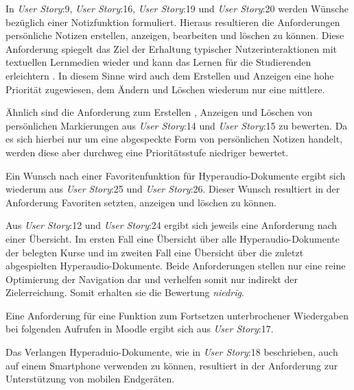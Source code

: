 In \textit{User Story}:9, \textit{User Story}:16, \textit{User Story}:19 und \textit{User Story}:20 werden Wünsche bezüglich einer Notizfunktion formuliert. Hieraus resultieren die Anforderungen persönliche Notizen erstellen, anzeigen, bearbeiten und löschen zu können. Diese Anforderung spiegelt das Ziel der Erhaltung typischer Nutzerinteraktionen mit textuellen Lernmedien wieder und kann das Lernen für die Studierenden erleichtern \citep{scutter2010students}. In diesem Sinne wird auch dem Erstellen und Anzeigen eine hohe Priorität zugewiesen, dem Ändern und Löschen wiederum nur eine mittlere.

Ähnlich sind die Anforderung zum Erstellen , Anzeigen und Löschen von persönlichen Markierungen aus \textit{User Story}:14 und \textit{User Story}:15 zu bewerten. Da es sich hierbei nur um eine abgespeckte Form von persönlichen Notizen handelt, werden diese aber durchweg eine Prioritätsstufe  niedriger bewertet.

Ein Wunsch nach einer Favoritenfunktion für Hyperaudio-Dokumente ergibt sich wiederum aus \textit{User Story}:25 und \textit{User Story}:26. Dieser Wunsch resultiert in der Anforderung Favoriten setzten, anzeigen und löschen zu können.

Aus \textit{User Story}:12 und \textit{User Story}:24 ergibt sich jeweils eine Anforderung nach einer Übersicht. Im ersten Fall eine Übersicht über alle Hyperaudio-Dokumente der belegten Kurse und im zweiten Fall eine Übersicht über die zuletzt abgespielten Hyperaudio-Dokumente. Beide Anforderungen stellen nur eine reine Optimierung der Navigation dar und verhelfen somit nur indirekt der Zielerreichung. Somit erhalten sie die Bewertung \textit{niedrig}.

Eine Anforderung für eine Funktion zum Fortsetzen unterbrochener Wiedergaben bei folgenden Aufrufen in Moodle ergibt sich aus \textit{User Story}:17.

Das Verlangen Hyperaduio-Dokumente, wie in \textit{User Story}:18 beschrieben, auch auf einem Smartphone verwenden zu können, resultiert in der Anforderung zur Unterstützung von mobilen Endgeräten.


